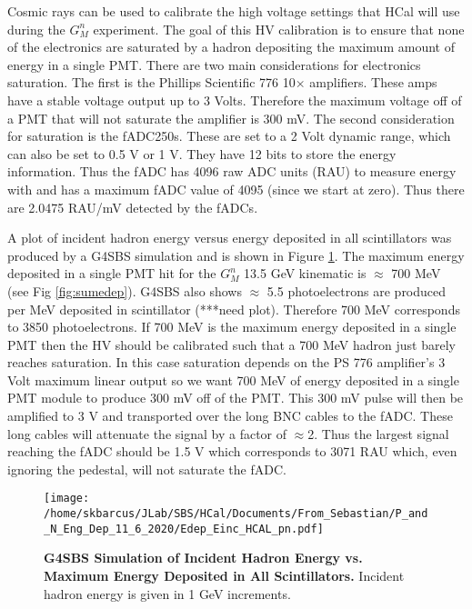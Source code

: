 \documentclass[10pt]{article}
\begin{document}
Cosmic rays can be used to calibrate the high voltage settings that HCal will use during the $G_M^n$ experiment. The goal of this HV calibration is to ensure that none of the electronics are saturated by a hadron depositing the maximum amount of energy in a single PMT. There are two main considerations for electronics saturation. The first is the Phillips Scientific 776 10$\times$ amplifiers. These amps have a stable voltage output up to 3 Volts. Therefore the maximum voltage off of a PMT that will not saturate the amplifier is 300 mV. The second consideration for saturation is the fADC250s. These are set to a 2 Volt dynamic range, which can also be set to 0.5 V or 1 V. They have 12 bits to store the energy information. Thus the fADC has 4096 raw ADC units (RAU) to measure energy with and has a maximum fADC value of 4095 (since we start at zero). Thus there are 2.0475 RAU/mV detected by the fADCs.

A plot of incident hadron energy versus energy deposited in all scintillators was produced by a G4SBS simulation and is shown in Figure \ref{fig:edep_vs_einc}. The maximum energy deposited in a single PMT hit for the $G_M^n$ 13.5 GeV kinematic is $\approx$ 700 MeV (see Fig \ref{fig:sumedep}). G4SBS also shows $\approx$ 5.5 photoelectrons are produced per MeV deposited in scintillator (***need plot). Therefore 700 MeV corresponds to 3850 photoelectrons. If 700 MeV is the maximum energy deposited in a single PMT then the HV should be calibrated such that a 700 MeV hadron just barely reaches saturation. In this case saturation depends on the PS 776 amplifier's 3 Volt maximum linear output so we want 700 MeV of energy deposited in a single PMT module to produce 300 mV off of the PMT. This 300 mV pulse will then be amplified to 3 V and transported over the long BNC cables to the fADC. These long cables will attenuate the signal by a factor of $\approx$2. Thus the largest signal reaching the fADC should be 1.5 V which corresponds to 3071 RAU which, even ignoring the pedestal, will not saturate the fADC.

 	\begin{figure}[!ht]
	\begin{center}
	\texttt{[image: /home/skbarcus/JLab/SBS/HCal/Documents/From\_Sebastian/P\_and\_N\_Eng\_Dep\_11\_6\_2020/Edep\_Einc\_HCAL\_pn.pdf]}
	\end{center}
	\caption{
	{\bf{G4SBS Simulation of Incident Hadron Energy vs. Maximum Energy Deposited in All Scintillators.}} Incident hadron energy is given in 1 GeV increments.}
	\label{fig:edep_vs_einc}
	\end{figure}	   
\end{document}
